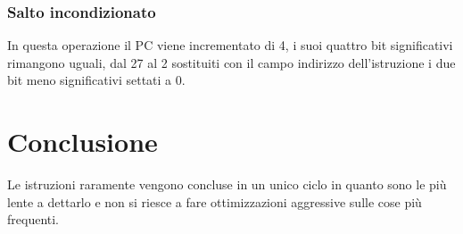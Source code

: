 \subsubsection{Salto incondizionato}
In questa operazione il PC viene incrementato di 4, i suoi quattro bit significativi rimangono uguali, dal 27 al 2 sostituiti con il campo indirizzo dell'istruzione 
i due bit meno significativi settati a 0.
\section{Conclusione}
Le istruzioni raramente vengono concluse in un unico ciclo in quanto sono le pi\`u lente a dettarlo e non si riesce a fare ottimizzazioni aggressive sulle cose pi\`u 
frequenti.

